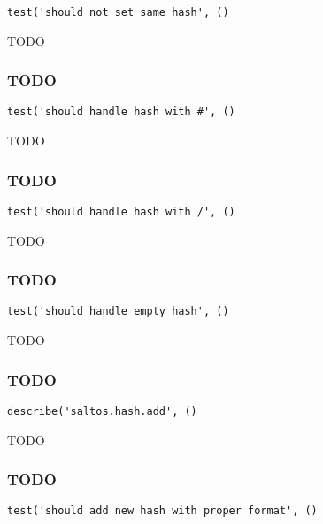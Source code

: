 \documentclass[a4paper]{article}
\begin{document}
\begin{lstlisting}
test('should not set same hash', ()
\end{lstlisting}

TODO

\hypertarget{toc644}{}
\subsubsection{TODO}

\begin{lstlisting}
test('should handle hash with #', ()
\end{lstlisting}

TODO

\hypertarget{toc645}{}
\subsubsection{TODO}

\begin{lstlisting}
test('should handle hash with /', ()
\end{lstlisting}

TODO

\hypertarget{toc646}{}
\subsubsection{TODO}

\begin{lstlisting}
test('should handle empty hash', ()
\end{lstlisting}

TODO

\hypertarget{toc647}{}
\subsubsection{TODO}

\begin{lstlisting}
describe('saltos.hash.add', ()
\end{lstlisting}

TODO

\hypertarget{toc648}{}
\subsubsection{TODO}

\begin{lstlisting}
test('should add new hash with proper format', ()
\end{lstlisting}
\end{document}

